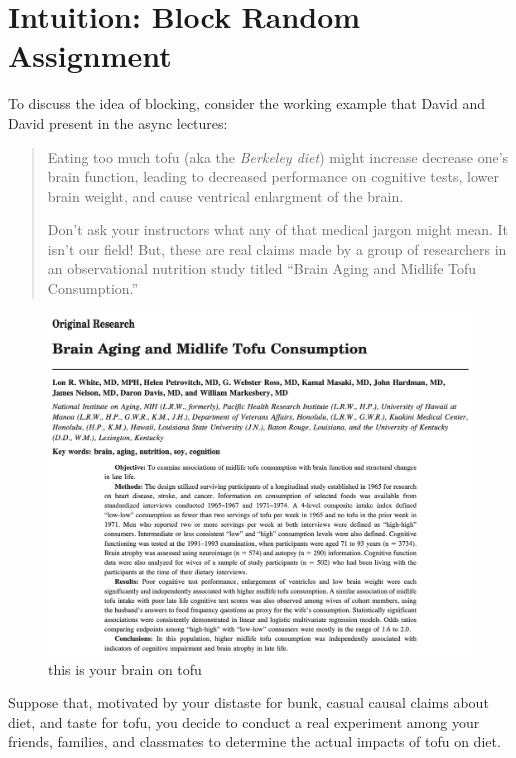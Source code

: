 \documentclass[
]{book}
\begin{document}
\hypertarget{intuition-block-random-assignment}{%
\section{Intuition: Block Random
Assignment}\label{intuition-block-random-assignment}}

To discuss the idea of blocking, consider the working example that David
and David present in the async lectures:

\begin{quote}
Eating too much tofu (aka the \emph{Berkeley diet}) might increase
decrease one's brain function, leading to decreased performance on
cognitive tests, lower brain weight, and cause ventrical enlargment of
the brain.

Don't ask your instructors what any of that medical jargon might mean.
It isn't our field! But, these are real claims made by a group of
researchers in an observational nutrition study titled ``Brain Aging and
Midlife Tofu Consumption.''
\end{quote}

\begin{figure}
\centering
\includegraphics{./images/this_is_your_brain_on_tofu_abstract.png}
\caption{this is your brain on tofu}
\end{figure}

Suppose that, motivated by your distaste for bunk, casual causal claims
about diet, and taste for tofu, you decide to conduct a real experiment
among your friends, families, and classmates to determine the actual
impacts of tofu on diet.
\end{document}
